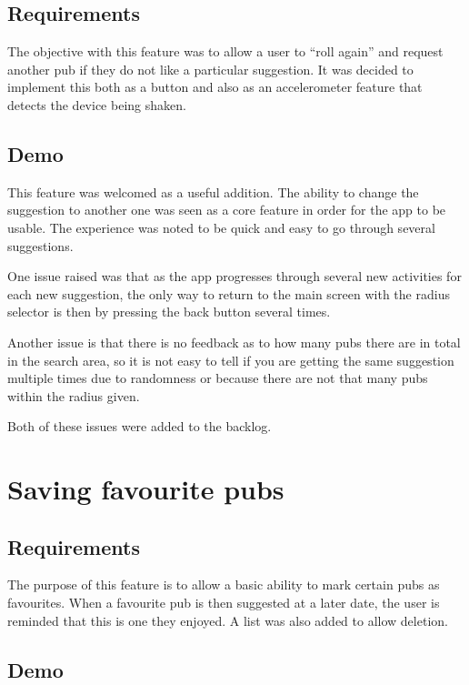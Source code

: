 \documentclass{report}
\begin{document}
\subsection{Requirements}

The objective with this feature was to allow a user to ``roll again'' and
request another pub if they do not like a particular suggestion. It was
decided to implement this both as a button and also as an accelerometer
feature that detects the device being shaken.

\subsection{Demo}

This feature was welcomed as a useful addition. The ability to change
the suggestion to another one was seen as a core feature in order
for the app to be usable. The experience was noted to be quick and
easy to go through several suggestions.

One issue raised was that as the app progresses through several new
activities for each new suggestion, the only way to return to the main
screen with the radius selector is then by pressing the back button
several times.

Another issue is that there is no feedback as to how many pubs there are
in total in the search area, so it is not easy to tell if you are
getting the same suggestion multiple times due to randomness or
because there are not that many pubs within the radius given.

Both of these issues were added to the backlog.

\section{Saving favourite pubs}
\label{sec:favourites}
\subsection{Requirements}

The purpose of this feature is to allow a basic ability to mark certain
pubs as favourites. When a favourite pub is then suggested at a later
date, the user is reminded that this is one they enjoyed. A list
was also added to allow deletion.

\subsection{Demo}
\end{document}

